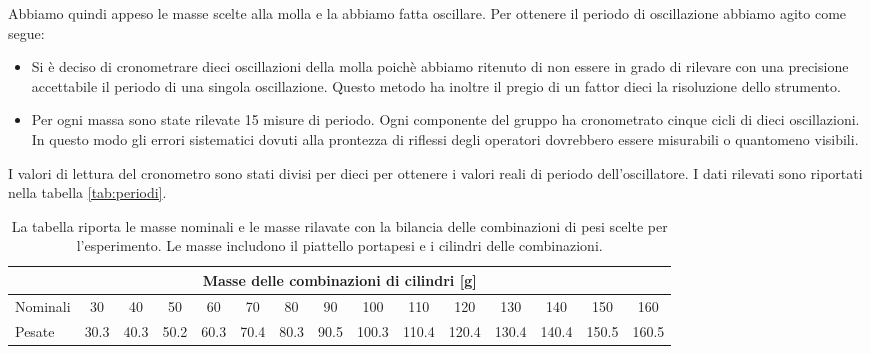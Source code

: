 Abbiamo quindi appeso le masse scelte alla molla e la abbiamo fatta oscillare.
Per ottenere il periodo di oscillazione abbiamo agito come segue:

\begin{itemize}
	\item{Si è deciso di cronometrare dieci oscillazioni della molla
        poichè abbiamo ritenuto di non essere in grado di rilevare con una precisione
        accettabile il periodo di una singola oscillazione. Questo metodo ha inoltre
        il pregio di un fattor dieci la risoluzione dello strumento.}

	\item{Per ogni massa sono state rilevate 15 misure di periodo.
        Ogni componente del gruppo ha cronometrato cinque cicli di dieci oscillazioni. 
        In questo modo gli errori sistematici dovuti alla prontezza di riflessi degli
        operatori dovrebbero essere misurabili o quantomeno visibili.}
\end{itemize}

I valori di lettura del cronometro sono stati divisi per dieci per ottenere i valori reali di periodo dell'oscillatore.
I dati rilevati sono riportati nella tabella \ref{tab:periodi}.

\begin{table}[b]
    \centering
    \scriptsize
    \begin{tabular}{l | c c c c c c c c c c c c c c}
        \multicolumn{15}{c}{\small \textbf{Masse delle combinazioni di cilindri [g]}} \\[1mm]
        \toprule
        Nominali & 30 & 40 & 50 & 60 & 70 & 80& 90 & 100 & 110 & 120 & 130 & 140 & 150 & 160 \\
        Pesate & 30.3 & 40.3 & 50.2 & 60.3 & 70.4 & 80.3 & 90.5 & 100.3 & 110.4 & 120.4 & 130.4 & 140.4 & 150.5 & 160.5 \\
        \bottomrule
    \end{tabular}
    \caption{La tabella riporta le masse nominali e le masse rilavate con la bilancia delle combinazioni di pesi scelte per
    l'esperimento. Le masse includono il piattello portapesi e i cilindri delle combinazioni.}
    \label{tab:masse_dinamico}
\end{table}

